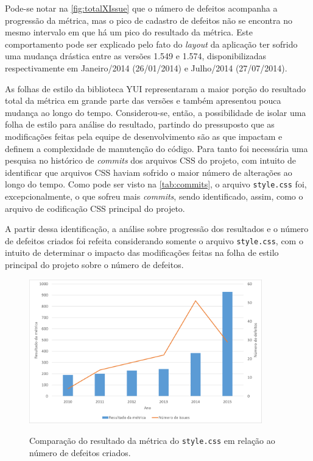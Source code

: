 Pode-se notar na \autoref{fig:totalXIssue} que o número de defeitos acompanha a progressão da métrica, mas o pico de cadastro de defeitos não se encontra no mesmo intervalo em que há um pico do resultado da métrica. Este comportamento pode ser explicado pelo fato do \textit{layout} da aplicação ter sofrido uma mudança drástica entre as versões 1.549 e 1.574, disponibilizadas respectivamente em Janeiro/2014 (26/01/2014) e Julho/2014 (27/07/2014).

As folhas de estilo da biblioteca YUI representaram a maior porção do resultado total da métrica em grande parte das versões e também apresentou pouca mudança ao longo do tempo. Considerou-se, então, a possibilidade de isolar uma folha de estilo para análise do resultado, partindo do pressuposto que as modificações feitas pela equipe de desenvolvimento são as que impactam e definem a complexidade de manutenção do código. Para tanto foi necessária uma pesquisa no histórico de \textit{commits} dos arquivos CSS do projeto, com intuito de identificar que arquivos CSS haviam sofrido o maior número de alterações ao longo do tempo. Como pode ser visto na \autoref{tab:commits}, o arquivo \texttt{style.css} foi, excepcionalmente, o que sofreu mais \textit{commits}, sendo identificado, assim, como o arquivo de codificação CSS principal do projeto.



A partir dessa identificação, a análise sobre progressão dos resultados e o número de defeitos criados foi refeita considerando somente o arquivo \texttt{style.css}, com o intuito de determinar o impacto das modificações feitas na folha de estilo principal do projeto sobre o número de defeitos.

\begin{figure}[!htb]
	\centering
	\caption{Comparação do resultado da métrica do \texttt{style.css} em relação ao número de defeitos criados.}
	\includegraphics[width=0.9\textwidth]{./04-figuras/style_issues}
	\label{fig:styleXIssues}
\end{figure}

